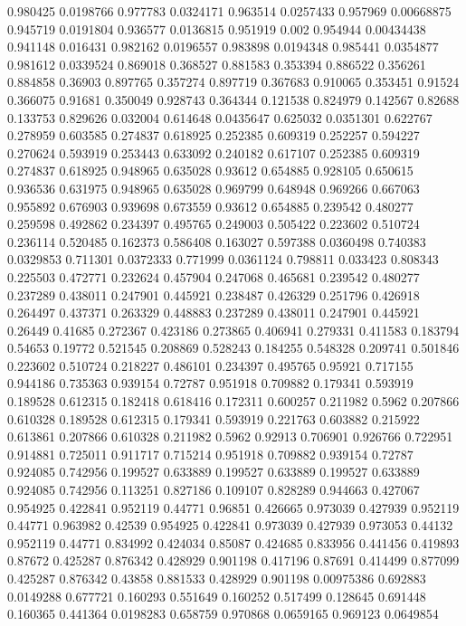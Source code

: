 0.980425 0.0198766
0.977783 0.0324171
0.963514 0.0257433
0.957969 0.00668875
0.945719 0.0191804
0.936577 0.0136815
0.951919 0.002
0.954944 0.00434438
0.941148 0.016431
0.982162 0.0196557
0.983898 0.0194348
0.985441 0.0354877
0.981612 0.0339524
0.869018 0.368527
0.881583 0.353394
0.886522 0.356261
0.884858 0.36903
0.897765 0.357274
0.897719 0.367683
0.910065 0.353451
0.91524 0.366075
0.91681 0.350049
0.928743 0.364344
0.121538 0.824979
0.142567 0.82688
0.133753 0.829626
0.032004 0.614648
0.0435647 0.625032
0.0351301 0.622767
0.278959 0.603585
0.274837 0.618925
0.252385 0.609319
0.252257 0.594227
0.270624 0.593919
0.253443 0.633092
0.240182 0.617107
0.252385 0.609319
0.274837 0.618925
0.948965 0.635028
0.93612 0.654885
0.928105 0.650615
0.936536 0.631975
0.948965 0.635028
0.969799 0.648948
0.969266 0.667063
0.955892 0.676903
0.939698 0.673559
0.93612 0.654885
0.239542 0.480277
0.259598 0.492862
0.234397 0.495765
0.249003 0.505422
0.223602 0.510724
0.236114 0.520485
0.162373 0.586408
0.163027 0.597388
0.0360498 0.740383
0.0329853 0.711301
0.0372333 0.771999
0.0361124 0.798811
0.033423 0.808343
0.225503 0.472771
0.232624 0.457904
0.247068 0.465681
0.239542 0.480277
0.237289 0.438011
0.247901 0.445921
0.238487 0.426329
0.251796 0.426918
0.264497 0.437371
0.263329 0.448883
0.237289 0.438011
0.247901 0.445921
0.26449 0.41685
0.272367 0.423186
0.273865 0.406941
0.279331 0.411583
0.183794 0.54653
0.19772 0.521545
0.208869 0.528243
0.184255 0.548328
0.209741 0.501846
0.223602 0.510724
0.218227 0.486101
0.234397 0.495765
0.95921 0.717155
0.944186 0.735363
0.939154 0.72787
0.951918 0.709882
0.179341 0.593919
0.189528 0.612315
0.182418 0.618416
0.172311 0.600257
0.211982 0.5962
0.207866 0.610328
0.189528 0.612315
0.179341 0.593919
0.221763 0.603882
0.215922 0.613861
0.207866 0.610328
0.211982 0.5962
0.92913 0.706901
0.926766 0.722951
0.914881 0.725011
0.911717 0.715214
0.951918 0.709882
0.939154 0.72787
0.924085 0.742956
0.199527 0.633889
0.199527 0.633889
0.199527 0.633889
0.924085 0.742956
0.113251 0.827186
0.109107 0.828289
0.944663 0.427067
0.954925 0.422841
0.952119 0.44771
0.96851 0.426665
0.973039 0.427939
0.952119 0.44771
0.963982 0.42539
0.954925 0.422841
0.973039 0.427939
0.973053 0.44132
0.952119 0.44771
0.834992 0.424034
0.85087 0.424685
0.833956 0.441456
0.419893 0.87672
0.425287 0.876342
0.428929 0.901198
0.417196 0.87691
0.414499 0.877099
0.425287 0.876342
0.43858 0.881533
0.428929 0.901198
0.00975386 0.692883
0.0149288 0.677721
0.160293 0.551649
0.160252 0.517499
0.128645 0.691448
0.160365 0.441364
0.0198283 0.658759
0.970868 0.0659165
0.969123 0.0649854
